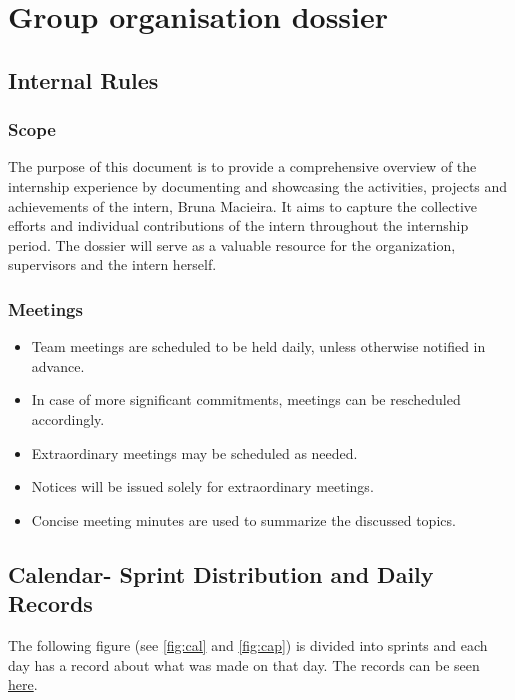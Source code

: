 \chapter{Group organisation dossier} \label{groupdossier}

\section{Internal Rules}

\subsection{Scope}
The purpose of this document is to provide a comprehensive overview of the internship experience by documenting and showcasing the activities, projects and achievements of the intern, Bruna Macieira. It aims to capture the collective efforts and individual contributions of the intern throughout the internship period. The dossier will serve as a valuable resource for the organization, supervisors and the intern herself.

\subsection{Meetings}

\begin{itemize}
\item Team meetings are scheduled to be held daily, unless otherwise notified in advance.

\item In case of more significant commitments, meetings can be rescheduled accordingly.

\item Extraordinary meetings may be scheduled as needed.

\item Notices will be issued solely for extraordinary meetings.

\item Concise meeting minutes are used to summarize the discussed topics.
\end{itemize}


\section{Calendar- Sprint Distribution and Daily Records}

The following figure (see \ref{fig:cal} and \ref{fig:cap}) is divided into sprints and each day has a record about what was made on that day. The records can be seen \href{https://docs.google.com/spreadsheets/d/1pNtDSX2snoRg8GJPjER8w_auBMuyReotaNJmS4W0FGc/edit#gid=649548965}{here}.

